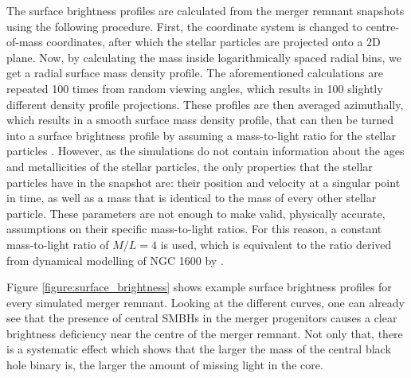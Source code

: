 \documentclass[english, oneside]{HYgradu}
\begin{document}
The surface brightness profiles are calculated from the merger remnant snapshots using the following procedure. First, the coordinate system is changed to centre-of-mass coordinates, after which the stellar particles are projected onto a 2D plane. Now, by calculating the mass inside logarithmically spaced radial bins, we get a radial surface mass density profile. The aforementioned calculations are repeated 100 times from random viewing angles, which results in 100 slightly different density profile projections. These profiles are then averaged azimuthally, which results in a smooth surface mass density profile, that can then be turned into a surface brightness profile by assuming a mass-to-light ratio for the stellar particles \citep{Rantala2018}. However, as the simulations do not contain information about the ages and metallicities of the stellar particles, the only properties that the stellar particles have in the snapshot are: their position and velocity at a singular point in time, as well as a mass that is identical to the mass of every other stellar particle. These parameters are not enough to make valid, physically accurate, assumptions on their specific mass-to-light ratios. For this reason, a constant mass-to-light ratio of $M/L = 4$ is used, which is equivalent to the ratio derived from dynamical modelling of NGC 1600 by \cite{Thomas2016}.

Figure \ref{figure:surface_brightness} shows example surface brightness profiles for every simulated merger remnant. Looking at the different curves, one can already see that the presence of central SMBHs in the merger progenitors causes a clear brightness deficiency near the centre of the merger remnant. Not only that, there is a systematic effect which shows that the larger the mass of the central black hole binary is, the larger the amount of missing light in the core.
\end{document}
